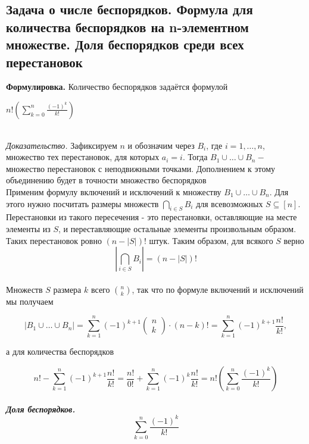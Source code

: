 \documentclass[a4paper]{article}
\begin{document}
\subsection{Задача о числе беспорядков. Формула для количества беспорядков на n-элементном множестве. Доля беспорядков среди всех перестановок}
\textbf{Формулировка.} Количество беспорядков задаётся формулой\\[2mm]
\centerline{$n!\left(\sum\limits_{k=0}^{n} \frac{(-1)^{k}}{k !}\right)$}\\[2mm]
\textit{Доказательство.} Зафиксируем $n$ и обозначим через $B_{i}$, где $i=1, \ldots, n$, множество тех перестановок, для которых $a_{i}=i$. Тогда $B_{1} \cup \ldots \cup B_{n}-$ множество перестановок с неподвижными точками. Дополнением к этому объединению будет в точности множество беспорядков\\[2mm]
\indent Применим формулу включений и исключений к множеству $B_{1} \cup \ldots \cup B_{n}$. Для этого нужно посчитать размеры множеств $\bigcap\limits_{i \in S} B_{i}$ для всевозможных $S \subseteq[n]$. Перестановки из такого пересечения - это перестановки, оставляющие на месте элементы из $S$, и переставляющие остальные элементы произвольным образом. Таких перестановок ровно $(n-|S|)$! штук. Таким образом, для всякого $S$ верно\\[2mm]
$$\left|\bigcap_{i \in S} B_{i}\right|=(n-|S|)!$$\\[2mm]
Множеств $S$ размера $k$ всего $\binom{n}{k}$, так что по формуле включений и исключений мы получаем

$$
\left|B_{1} \cup \ldots \cup B_{n}\right|=\sum_{k=1}^{n}(-1)^{k+1}\left(\begin{array}{l}
n \\
k
\end{array}\right) \cdot(n-k) !=\sum_{k=1}^{n}(-1)^{k+1} \frac{n !}{k !},
$$

а для количества беспорядков

$$
n !-\sum_{k=1}^{n}(-1)^{k+1} \frac{n !}{k !}=\frac{n !}{0 !}+\sum_{k=1}^{n}(-1)^{k} \frac{n !}{k !}=n !\left(\sum_{k=0}^{n} \frac{(-1)^{k}}{k !}\right)
$$\\[2mm]
\textit{\textbf{Доля беспорядков.}} $$
\sum_{k=0}^{n} \frac{(-1)^{k}}{k !}
$$
\end{document}
